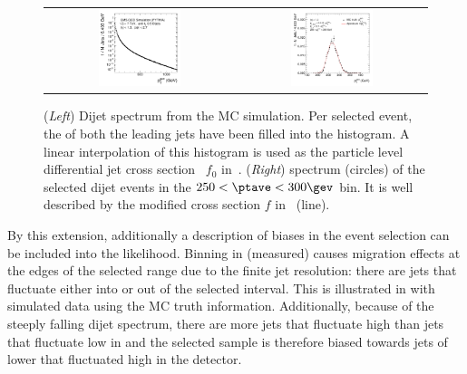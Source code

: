 \begin{figure}[ht]
 \centering
  \begin{tabular}{cc}
    \includegraphics[width=0.45\textwidth]{figures/ExampleSpectrum} &
    \includegraphics[width=0.45\textwidth]{figures/MaxLike_Eta00-13_SpectrumJet1_PtBin7}\\
 \end{tabular}
  \caption{(\textit{Left}) Dijet \ptgen spectrum from the MC simulation.
    Per selected event, the \ptgen of both the leading jets have been filled into the histogram.
    A linear interpolation of this histogram is used as the particle
    level differential jet cross section~ $f_{0}$ in~.
    (\textit{Right}) \ptgen spectrum (circles) of the selected dijet events in the \mbox{$250 < \ptave < 300\gev$} bin.
    It is well described by the modified cross section $f$ in~ (line).}
  \label{fig:ResFit:DataDriven:Spectrum}
\end{figure}

By this extension, additionally a description of biases in the event selection can be included into the likelihood.
Binning in (measured) \ptave causes migration effects at the edges of the selected \ptave range due to the finite jet \pt resolution:
there are jets that fluctuate either into or out of the selected interval.
This is illustrated in  with simulated data using the MC truth information.
Additionally, because of the steeply falling dijet \pt spectrum, there are more jets that fluctuate high than jets that fluctuate low in \pt and the selected sample is therefore biased towards jets of lower \ptgen that fluctuated high in the detector.

